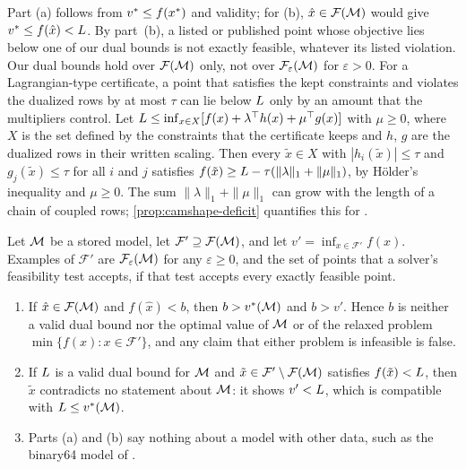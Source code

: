Part (a) follows from $v^{*}\le f(x^*)$ and validity; for (b), $\hat x\in\mathcal{F}(\mathcal{M})$ would give $v^{*}\le f(\hat x)<L$.
By part~(b), a listed or published point whose objective lies below one of our dual bounds is not exactly feasible, whatever its listed violation.
Our dual bounds hold over $\mathcal{F}(\mathcal{M})$ only, not over $\mathcal{F}_\varepsilon(\mathcal{M})$ for $\varepsilon>0$.
For a Lagrangian-type certificate, a point that satisfies the kept constraints and violates the dualized rows by at most $\tau$ can lie below $L$ only by an amount that the multipliers control.
Let $L\le\inf_{x\in X}[f(x)+\lambda^{\top}h(x)+\mu^{\top}g(x)]$ with $\mu\ge0$, where $X$ is the set defined by the constraints that the certificate keeps and $h$, $g$ are the dualized rows in their written scaling.
Then every $\tilde x\in X$ with $|h_i(\tilde x)|\le\tau$ and $g_j(\tilde x)\le\tau$ for all $i$ and $j$ satisfies $f(\tilde x)\ge L-\tau(\|\lambda\|_1+\|\mu\|_1)$, by Hölder's inequality and $\mu\ge0$.
The sum $\|\lambda\|_1+\|\mu\|_1$ can grow with the length of a chain of coupled rows; \cref{prop:camshape-deficit} quantifies this for .

\begin{proposition}\label{prop:sem-refutation}
Let $\mathcal{M}$ be a stored model, let $\mathcal{F}'\supseteq\mathcal{F}(\mathcal{M})$, and let $v'=\inf_{x\in\mathcal{F}'}f(x)$.
Examples of $\mathcal{F}'$ are $\mathcal{F}_\varepsilon(\mathcal{M})$ for any $\varepsilon\ge0$, and the set of points that a solver's feasibility test accepts, if that test accepts every exactly feasible point.
\begin{enumerate}\setlength{\itemsep}{0pt}\setlength{\parsep}{0pt}
\item[(a)] If $\hat x\in\mathcal{F}(\mathcal{M})$ and $f(\hat x)<b$, then $b>v^{*}(\mathcal{M})$ and $b>v'$.
Hence $b$ is neither a valid dual bound nor the optimal value of $\mathcal{M}$ or of the relaxed problem $\min\{f(x):x\in\mathcal{F}'\}$, and any claim that either problem is infeasible is false.
\item[(b)] If $L$ is a valid dual bound for $\mathcal{M}$ and $\tilde x\in\mathcal{F}'\setminus\mathcal{F}(\mathcal{M})$ satisfies $f(\tilde x)<L$, then $\tilde x$ contradicts no statement about $\mathcal{M}$: it shows $v'<L$, which is compatible with $L\le v^{*}(\mathcal{M})$.
\item[(c)] Parts (a) and (b) say nothing about a model with other data, such as the binary64 model of .
\end{enumerate}
\end{proposition}

